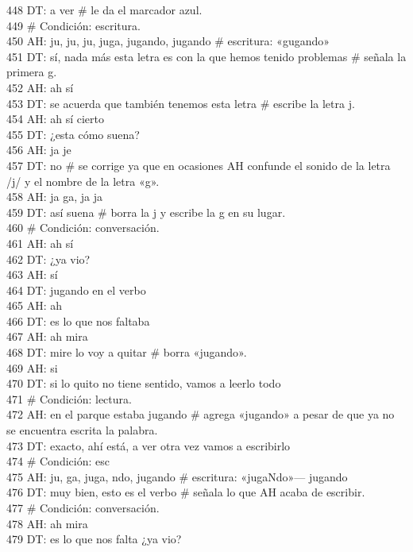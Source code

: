 448 DT: a ver \# le da el marcador azul.\\
449 \# Condición: escritura.\\
450 AH: ju, ju, ju, juga, jugando, jugando \# escritura: «gugando»\\
451 DT: sí, nada más esta letra es con la que hemos tenido problemas \# señala la primera g.\\
452 AH: ah sí\\
453 DT: se acuerda que también tenemos esta letra \# escribe la letra j.\\
454 AH: ah sí cierto\\
455 DT: ¿esta cómo suena?\\
456 AH: ja je\\
457 DT: no \# se corrige ya que en ocasiones AH confunde el sonido de la letra /j/ y el nombre de la letra «g».\\
458 AH: ja ga, ja ja\\
459 DT: así suena \# borra la j y escribe la g en su lugar.\\
460 \# Condición: conversación.\\
461 AH: ah sí\\
462 DT: ¿ya vio?\\
463 AH: sí\\
464 DT: jugando en el verbo\\
465 AH: ah\\
466 DT: es lo que nos faltaba\\
467 AH: ah mira\\
468 DT: mire lo voy a quitar \# borra «jugando».\\
469 AH: si\\
470 DT: si lo quito no tiene sentido, vamos a leerlo todo\\
471 \# Condición: lectura.\\
472 AH: en el parque estaba jugando \# agrega «jugando» a pesar de que ya no se encuentra escrita la palabra.\\
473 DT: exacto, ahí está, a ver otra vez vamos a escribirlo\\
474 \# Condición: esc\\
475 AH: ju, ga, juga, ndo, jugando \# escritura: «jugaNdo»--- jugando\\
476 DT: muy bien, esto es el verbo \# señala lo que AH acaba de escribir.\\
477 \# Condición: conversación.\\
478 AH: ah mira\\
479 DT: es lo que nos falta ¿ya vio?\\
